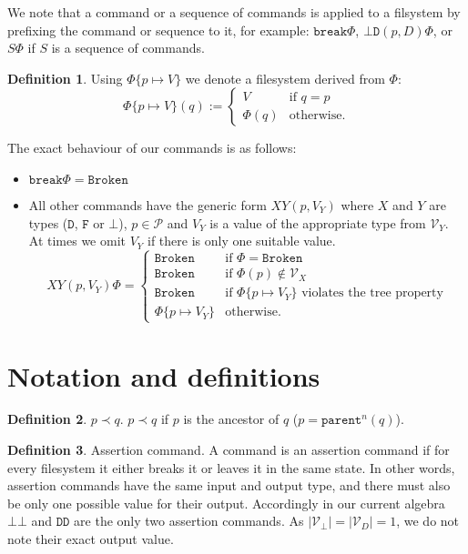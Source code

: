 \documentclass[12pt]{article}
\newcommand{\setvx}[1]{\mathcal{V}_{#1}}
\newcommand{\setd}{\setvx{D}}
\newcommand{\setb}{\setvx{\empt}}
\newcommand{\setp}{\mathcal{P}}
\newcommand{\empt}{\bot}
\newcommand{\parent}{\mathtt{parent}}
\newcommand{\fsbroken}{\mathtt{Broken}} %
\newcommand{\FS}{\Phi} %
\newcommand{\cbrk}{\mathtt{break}}
\newcommand{\fscommand}[2]{{#1#2}}
\newcommand{\fsregcommandchar}[1]{\mathtt{#1}}
\newcommand{\fsregcommand}[2]{\fscommand{\fsregcommandchar{#1}}{\fsregcommandchar{#2}}}
\newcommand{\cbb}{\fsregcommand{\empt}{\empt}}
\newcommand{\cbd}{\fsregcommand{\empt}{D}}
\newcommand{\cdd}{\fsregcommand{D}{D}}
\newcommand{\cxy}{\fscommand{X}{Y}}
\newcommand{\descendant}{\prec}
\theoremstyle{definition}
\newtheorem{mydef}{Definition}
\begin{document}
We note that a command or a sequence of commands is applied to a filsystem
by prefixing the command or sequence to it, for example: $\cbrk\FS$, $\cbd(p,D)\FS$, 
or $S\FS$ if $S$ is a sequence of commands.

\begin{mydef}
Using $\FS\{p\mapsto V\}$ we denote a filesystem derived from $\FS$:
\[ \FS\{p\mapsto V\}(q) :=
   \begin{cases}
   V &\mbox{if~} q=p\\
   \FS(q) &\mbox{otherwise.}
   \end{cases}
\]
\end{mydef}

The exact behaviour of our commands is as follows:
\begin{itemize}
\item $\cbrk\FS = \fsbroken$
\item
All other commands have the generic form $\cxy(p,V_Y)$ where
$X$ and $Y$ are types ($\fsregcommandchar{D}$, $\fsregcommandchar{F}$ or $\fsregcommandchar{\empt}$),
$p\in\setp$ and $V_Y$ is a value of the appropriate type from $\setvx{Y}$.
At times we omit $V_Y$ if there is only one suitable value.
\[ \cxy(p,V_Y)\FS = 
   \begin{cases}
   \fsbroken &\mbox{if~} \FS=\fsbroken\\
   \fsbroken &\mbox{if~} \FS(p)\not\in\setvx{X}\\
   \fsbroken &\mbox{if~} \FS\{p\mapsto V_Y\} \mbox{~violates the tree property}\\
   \FS\{p\mapsto V_Y\} &\mbox{otherwise.}
   \end{cases}
\]
\end{itemize}

\section{Notation and definitions}

\begin{mydef}{$p\descendant q$.}
$p\descendant q$ if $p$ is the ancestor of $q$ ($p=\parent^n(q)$).
\end{mydef}

\begin{mydef}{Assertion command.}
A command is an assertion command if
for every filesystem it either breaks it or leaves it in the same state.
In other words, assertion commands have the same input and output type,
and there must also be only one possible value for their output.
Accordingly in our current algebra $\cbb$ and $\cdd$ are the only two assertion commands.
As $|\setb|=|\setd|=1$, we do not note their exact output value.
\end{mydef}
\end{document}
